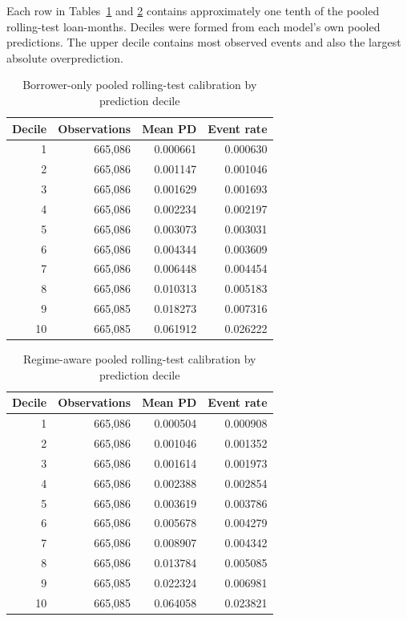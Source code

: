 Each row in Tables~\ref{tab:appendix-baseline-calibration} and \ref{tab:appendix-regime-calibration} contains approximately one tenth of the pooled rolling-test loan-months. Deciles were formed from each model's own pooled predictions. The upper decile contains most observed events and also the largest absolute overprediction.

\begin{table}[htbp]
\centering
\caption{Borrower-only pooled rolling-test calibration by prediction decile}
\label{tab:appendix-baseline-calibration}
\small
\begin{tabular}{rrrr}
\toprule
Decile & Observations & Mean PD & Event rate \\
\midrule
1 & 665,086 & 0.000661 & 0.000630 \\
2 & 665,086 & 0.001147 & 0.001046 \\
3 & 665,086 & 0.001629 & 0.001693 \\
4 & 665,086 & 0.002234 & 0.002197 \\
5 & 665,086 & 0.003073 & 0.003031 \\
6 & 665,086 & 0.004344 & 0.003609 \\
7 & 665,086 & 0.006448 & 0.004454 \\
8 & 665,086 & 0.010313 & 0.005183 \\
9 & 665,085 & 0.018273 & 0.007316 \\
10 & 665,085 & 0.061912 & 0.026222 \\
\bottomrule
\end{tabular}
\end{table}

\begin{table}[htbp]
\centering
\caption{Regime-aware pooled rolling-test calibration by prediction decile}
\label{tab:appendix-regime-calibration}
\small
\begin{tabular}{rrrr}
\toprule
Decile & Observations & Mean PD & Event rate \\
\midrule
1 & 665,086 & 0.000504 & 0.000908 \\
2 & 665,086 & 0.001046 & 0.001352 \\
3 & 665,086 & 0.001614 & 0.001973 \\
4 & 665,086 & 0.002388 & 0.002854 \\
5 & 665,086 & 0.003619 & 0.003786 \\
6 & 665,086 & 0.005678 & 0.004279 \\
7 & 665,086 & 0.008907 & 0.004342 \\
8 & 665,086 & 0.013784 & 0.005085 \\
9 & 665,085 & 0.022324 & 0.006981 \\
10 & 665,085 & 0.064058 & 0.023821 \\
\bottomrule
\end{tabular}
\end{table}

